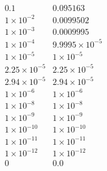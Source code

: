 \documentclass[a4paper,parskip,headheight=38pt]{scrartcl} %
\begin{document}

\[\begin{array}{rr}
0.1                 & 0.095163 \\
1\times 10^{-2}     & 0.0099502 \\
1\times 10^{-3}     & 0.0009995 \\
1\times 10^{-4}     & 9.9995\times 10^{-5} \\
1\times 10^{-5}     & 1\times 10^{-5} \\
2.25\times 10^{-5}  & 2.25\times 10^{-5} \\
2.94\times 10^{-5}  & 2.94\times 10^{-5} \\
1\times 10^{-6}     & 1\times 10^{-6} \\
1\times 10^{-8}     & 1\times 10^{-8} \\
1\times 10^{-9}     & 1\times 10^{-9} \\
1\times 10^{-10}     & 1\times 10^{-10} \\
1\times 10^{-11}     & 1\times 10^{-11} \\
1\times 10^{-12}     & 1\times 10^{-12} \\
0                   & 0.0
\end{array}\]
\end{document}
